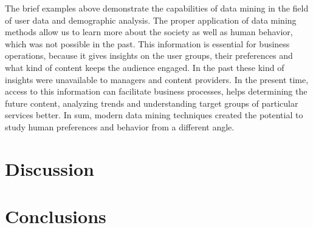 \documentclass[conference]{IEEEtran}
\begin{document}

The brief examples above demonstrate the capabilities of data mining in the field of user data and demographic analysis. The proper application of data mining methods allow us to learn more about the society as well as human behavior, which was not possible in the past. This information is essential for business operations, because it gives insights on the user groups, their preferences and what kind of content keeps the audience engaged. In the past these kind of insights were unavailable to managers and content providers. In the present time, access to this information can facilitate business processes, helps determining the future content, analyzing trends and understanding target groups of particular services better. In sum, modern data mining techniques created the potential to study human preferences and behavior from a different angle. 
\section{Discussion}

\section{Conclusions} 



\end{document}
